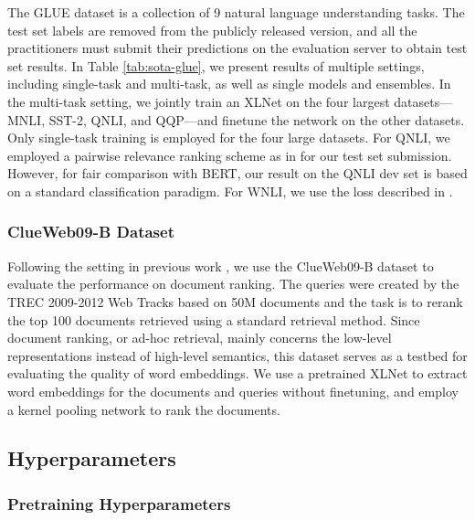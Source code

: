 \documentclass{article}
\begin{document}
The GLUE dataset \cite{wang2019glue} is a collection of 9 natural language understanding tasks. 
The test set labels are removed from the publicly released version, and all the practitioners must submit their predictions on the evaluation server to obtain test set results. In Table \ref{tab:sota-glue}, we present results of multiple settings, including single-task and multi-task, as well as single models and ensembles. In the multi-task setting, we jointly train an XLNet on the four largest datasets---MNLI, SST-2, QNLI, and QQP---and finetune the network on the other datasets. Only single-task training is employed for the four large datasets. For QNLI, we employed a pairwise relevance ranking scheme as in \cite{liu2019multi} for our test set submission. However, for fair comparison with BERT, our result on the QNLI dev set is based on a standard classification paradigm. For WNLI, we use the loss described in \cite{kocijan2019surprisingly}.

\subsubsection{ClueWeb09-B Dataset}

Following the setting in previous work \cite{dai2018convolutional}, we use the ClueWeb09-B dataset to evaluate the performance on document ranking. The queries were created by the TREC 2009-2012 Web Tracks based on 50M documents and the task is to rerank the top 100 documents retrieved using a standard retrieval method. Since document ranking, or ad-hoc retrieval, mainly concerns the low-level representations instead of high-level semantics, this dataset serves as a testbed for evaluating the quality of word embeddings. We use a pretrained XLNet to extract word embeddings for the documents and queries without finetuning, and employ a kernel pooling network \cite{xiong2017end} to rank the documents.

\subsection{Hyperparameters} \label{sec:hp}

\subsubsection{Pretraining Hyperparameters}
\end{document}
